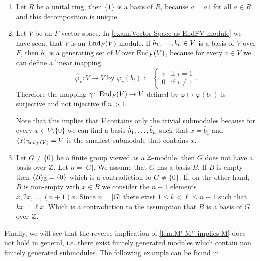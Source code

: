 \begin{exam}\label{exam.Bases of Modules}
\begin{enumerate}
\item Let $R$ be a unital ring, then $\lbrace 1\rbrace$ is a basis of $R$, because $a=a1$ for all $a\in R$ and this decomposition is unique.
\item Let $V$ be an $F$-vector space. In \cref{exam.Vector Space as EndFV-module} we have seen, that $V$ is an $\operatorname{\mathrm{End}}_F(V)$-module. If $b_{1},\ldots,b_{n}\in V$ is a basis of $V$ over $F$, then $b_1$ is a generating set of $V$ over $\operatorname{\mathrm{End}}_F(V)$, because for every $v\in V$ we can define a linear mapping 
\begin{equation*}
\varphi_v\colon V\to V \text{ by } \varphi_v(b_i):= \begin{cases}v & \text{if } i=1\\ 0 & \text{if } i\neq 1\end{cases}.
\end{equation*}
Therefore the mapping $\gamma\colon \operatorname{\mathrm{End}}_F(V)\to V$ defined by $\varphi\mapsto \varphi(b_1)$ is surjective and not injective if $n>1$.

Note that this implies that $V$ contains only the trivial submodules because for every $x\in V\setminus\lbrace 0\rbrace$ we can find a basis $\hat{b}_{1},\ldots,\hat{b}_{n}$ such that $x=\hat{b}_1$ and $\langle x\rangle_{\operatorname{\mathrm{End}}_F(V)}=V$ is the smallest submodule that contains $x$. \label{exam. Generating set of V over EndFV}
\item Let $G\neq\lbrace 0\rbrace$ be a finite group viewed as a $\operatorname{\mathbb{Z}}$-module, then $G$ does not have a basis over $\operatorname{\mathbb{Z}}$. Let $n=|G|$. We assume that $G$ has a basis $B$. If $B$ is empty then $\langle B\rangle_{\operatorname{\mathbb{Z}}} =\lbrace 0\rbrace$ which is a contradiction to $G\neq\lbrace 0\rbrace$. If, on the other hand, $B$ is non-empty with $x\in B$ we consider the $n+1$ elements $x,2x,\ldots,(n+1)x$. Since $n=| G|$ there exist $1\leq k<\ell\leq n+1$ such that $kx=\ell x$. Which is a contradiction to the assumption that $B$ is a basis of $G$ over $\operatorname{\mathbb{Z}}$.\label{exam.basis of G}
\end{enumerate}
\end{exam}

Finally, we will see that the reverse implication of \cref{lem.M' M'' implies M} does not hold in general, i.e. there exist finitely generated modules which contain non finitely generated submodules. The following example can be found in \cite[p.197]{jantzen2005algebra}.

